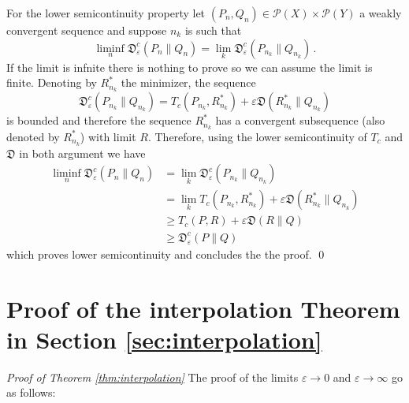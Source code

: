 \documentclass{amsart}
\theoremstyle{definition}
\theoremstyle{remark}
\numberwithin{equation}{section}
\begin{document}
For the lower semicontinuity property
let $(P_n,Q_n) \in  \mathcal{P}(X)\times \mathcal{P}(Y)$  
a weakly convergent sequence and suppose $n_k$ is such that 
\begin{equation}
\liminf_{n} \mathfrak{D}^{c}_{\varepsilon}(P_n\|Q_n) = \lim_{k} \mathfrak{D}^{c}_{\varepsilon}(P_{n_k}\|Q_{n_k})\,. 
\end{equation}
If the limit is infnite there is nothing to prove so we can assume the limit is finite. 
Denoting by $R_{n_k}^*$ the minimizer,  the sequence 
\begin{equation}
\mathfrak{D}^{c}_{\varepsilon}(P_{n_k}\|Q_{n_k})= T_c(P_{n_k},R_{n_k}^*) + \varepsilon \mathfrak{D}(R_{n_k}^*\|Q_{n_k}) 
\end{equation}
is bounded and therefore the sequence $R_{n_k}^*$ has a convergent subsequence
(also denoted by $R_{n_k}^*$) with limit $R$. 
Therefore, using the lower semicontinuity of $T_c$ and $\mathfrak{D}$ in both argument we have
\begin{equation}
\begin{aligned}
\liminf_{n} \mathfrak{D}^{c}_{\varepsilon}(P_n\|Q_n) &= \lim_{k} \mathfrak{D}^{c}_{\varepsilon}(P_{n_k}\|Q_{n_k})\\
&= \lim_{k} T_c(P_{n_k},R_{n_k}^*) + \varepsilon \mathfrak{D}(R_{n_k}^*\|Q_{n_k})  \\ 
&\ge T_c(P,R) + \varepsilon \mathfrak{D}(R\|Q)\\
&\ge  \mathfrak{D}^{c}_{\varepsilon}(P\|Q)
\end{aligned}
\end{equation}
which proves lower semicontinuity and concludes the the proof. \qed


\section{Proof of the interpolation Theorem %
in Section \ref{sec:interpolation}}
\label{sec:proofs.interpolation}

\noindent
{\it Proof of Theorem \ref{thm:interpolation}} The proof of the limits $\varepsilon \to 0$ and $\varepsilon \to \infty$ go as follows:
\medskip
\end{document}
